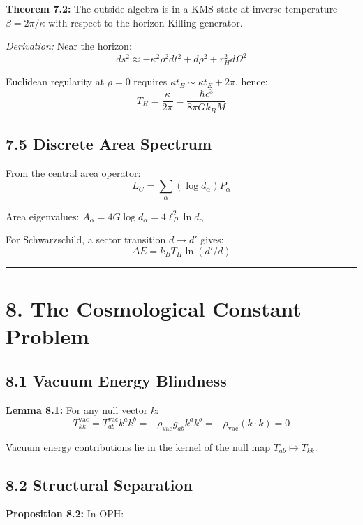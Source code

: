 \textbf{Theorem 7.2:} The outside algebra is in a KMS state at inverse temperature \(\beta = 2\pi/\kappa\) with respect to the horizon Killing generator.

\emph{Derivation:} Near the horizon: \[ds^2 \approx -\kappa^2 \rho^2 dt^2 + d\rho^2 + r_H^2 d\Omega^2\]

Euclidean regularity at \(\rho = 0\) requires \(\kappa t_E \sim \kappa t_E + 2\pi\), hence: \[T_H = \frac{\kappa}{2\pi} = \frac{\hbar c^3}{8\pi G k_B M}\]

\subsection{7.5 Discrete Area Spectrum}\label{75-discrete-area-spectrum}

From the central area operator: \[L_C = \sum_\alpha (\log d_\alpha) P_\alpha\]

Area eigenvalues: \(A_\alpha = 4G \log d_\alpha = 4\ell_P^2 \ln d_\alpha\)

For Schwarzschild, a sector transition \(d \to d'\) gives: \[\Delta E = k_B T_H \ln(d'/d)\]

\begin{center}\rule{0.5\linewidth}{0.5pt}\end{center}

\section{8. The Cosmological Constant Problem}\label{8-the-cosmological-constant-problem}

\subsection{8.1 Vacuum Energy Blindness}\label{81-vacuum-energy-blindness}

\textbf{Lemma 8.1:} For any null vector \(k\): \[T^{\text{vac}}_{kk} = T^{\text{vac}}_{ab} k^a k^b = -\rho_{\text{vac}} g_{ab} k^a k^b = -\rho_{\text{vac}}(k \cdot k) = 0\]

Vacuum energy contributions lie in the kernel of the null map \(T_{ab} \mapsto T_{kk}\).

\subsection{8.2 Structural Separation}\label{82-structural-separation}

\textbf{Proposition 8.2:} In OPH:

